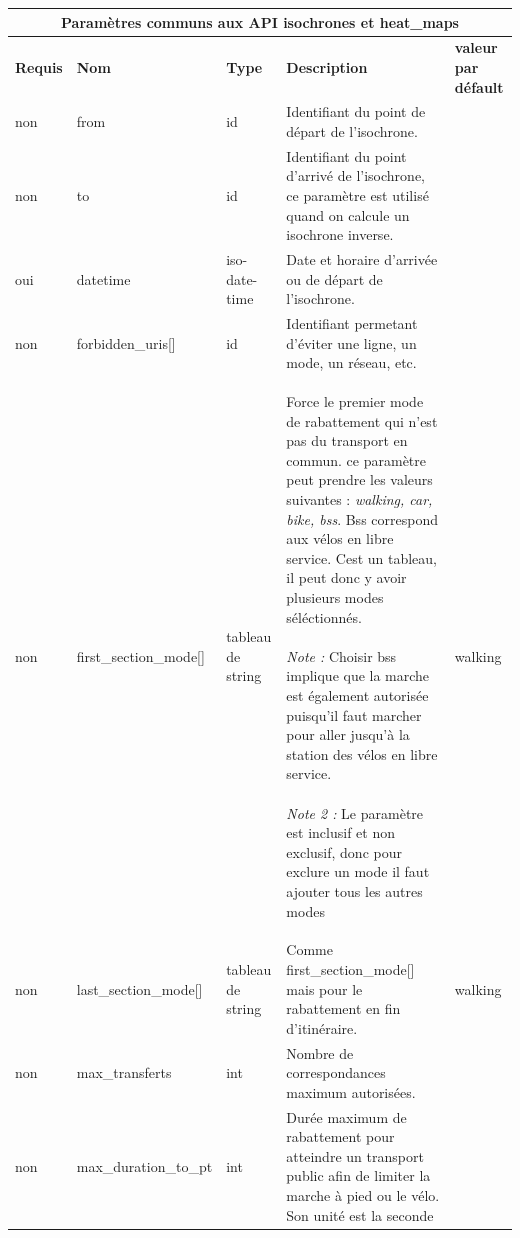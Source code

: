 \documentclass[a4paper]{report}
\begin{document}
\begin{center}
	\begin{tabular}{|l|l|p{1.5cm}|p{6cm}|l|}
	\hline
	\multicolumn{5}{|c|}{\cellcolor{LightCyan} \textbf{Paramètres communs aux API isochrones et heat\_maps}} \\
	\hline
	\textbf{Requis} & \textbf{Nom} & \textbf{Type} & \textbf{Description} &  \textbf{valeur par défault} \\
	\hline
	non & from & id & Identifiant du point de départ de l'isochrone. &\\
	\hline
	non & to & id & Identifiant du point d'arrivé de l'isochrone, ce paramètre est utilisé quand on calcule un isochrone inverse. &\\
	\hline
	oui & datetime & iso-date-time & Date et horaire d'arrivée ou de départ de l'isochrone. & \\
	\hline
	non & forbidden\_uris[] & id & Identifiant permetant d'éviter une ligne, un mode, un réseau, etc. & \\
	\hline
	non & first\_section\_mode[] & tableau de string & Force le premier mode de rabattement qui n'est pas du transport en commun.  ce paramètre peut prendre les valeurs suivantes : \emph{walking, car, bike, bss}. Bss correspond aux vélos en libre service. Cest un tableau, il peut donc y avoir plusieurs modes séléctionnés.
	\paragraph{}\emph{Note :} Choisir bss implique que la marche est également autorisée puisqu'il faut marcher pour aller jusqu'à la station des vélos en libre service.
	\paragraph{}\emph{Note 2 :} Le paramètre est inclusif et non exclusif, donc pour exclure un mode il faut ajouter tous les autres modes & walking \\ 
	\hline
	non & last\_section\_mode[] & tableau de string & Comme first\_section\_mode[] mais pour le rabattement en fin d'itinéraire. & walking \\ 
	\hline
	non & max\_transferts & int & Nombre de correspondances maximum autorisées. & \\
	\hline
	non & max\_duration\_to\_pt & int & Durée maximum de rabattement pour atteindre un transport public afin de limiter la marche à pied ou le vélo. Son unité est la seconde

\end{tabular}
\end{center}
\end{document}
